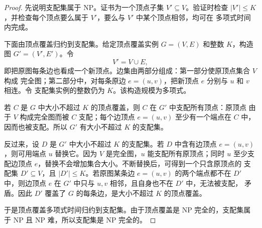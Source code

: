 \documentclass[11pt, a4paper]{article}
\begin{document}
\begin{proof}
    先说明支配集属于 NP。证书为一个顶点子集 $V'\subseteq V$。验证时检查
    $|V'|\le K$，并检查每个顶点要么属于 $V'$，要么与 $V'$ 中某个顶点相邻，均可在
    多项式时间内完成。

    下面由顶点覆盖归约到支配集。给定顶点覆盖实例 $G=(V,E)$ 和整数 $K$，构造图
    $G'=(V',E')$。令
    \[
        V'=V\cup E,
    \]
    即把原图每条边也看成一个新顶点。边集由两部分组成：第一部分使原顶点集合 $V$ 构成
    完全图；第二部分中，对每条原边 $e=(u,v)$，把新顶点 $e$ 分别与 $u$ 和 $v$ 相连。令
    支配集实例的整数仍为 $K$。该构造规模为多项式。

    若 $C$ 是 $G$ 中大小不超过 $K$ 的顶点覆盖，则 $C$ 在 $G'$ 中支配所有顶点：原顶点
    由于 $V$ 构成完全图而被 $C$ 支配；每个边顶点 $e=(u,v)$ 至少有一个端点在 $C$ 中，
    因而也被支配。所以 $G'$ 有大小不超过 $K$ 的支配集。

    反过来，设 $D$ 是 $G'$ 中大小不超过 $K$ 的支配集。若 $D$ 中含有边顶点
    $e=(u,v)$，则可用端点 $u$ 替换它。因为 $V$ 是完全图，$u$ 能支配所有原顶点；同时
    $u$ 至少支配边顶点 $e$，替换不会增加集合大小。不断替换后，可得到一个只含原顶点的
    支配集 $D'\subseteq V$，且 $|D'|\le K$。若原图某条边 $e=(u,v)$ 的两个端点都不在
    $D'$ 中，则边顶点 $e$ 在 $G'$ 中只与 $u,v$ 相邻，且自身也不在 $D'$ 中，无法被支配，
    矛盾。因此 $D'$ 覆盖了 $G$ 的每条边，是大小不超过 $K$ 的顶点覆盖。

    于是顶点覆盖多项式时间归约到支配集。由于顶点覆盖是 NP 完全的，支配集属于 NP 且
    NP 难，所以支配集是 NP 完全的。
\end{proof}
\end{document}
